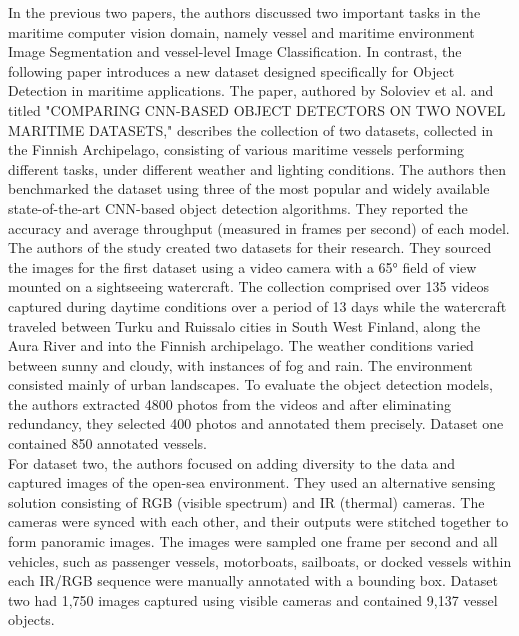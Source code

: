 In the previous two papers, the authors discussed two important tasks in the maritime computer vision domain, namely vessel and maritime environment Image Segmentation and vessel-level Image Classification. In contrast, the following paper introduces a new dataset designed specifically for Object Detection in maritime applications. The paper, authored by Soloviev et al. and titled "COMPARING CNN-BASED OBJECT DETECTORS ON TWO NOVEL MARITIME DATASETS,"\cite{soloviev2020comparing} describes the collection of two datasets, collected in the Finnish Archipelago, consisting of various maritime vessels performing different tasks, under different weather and lighting conditions. The authors then benchmarked the dataset using three of the most popular and widely available state-of-the-art CNN-based object detection algorithms. They reported the accuracy and average throughput (measured in frames per second) of each model. 
\\

The authors of the study created two datasets for their research. They sourced the images for the first dataset using a video camera with a 65° field of view mounted on a sightseeing watercraft. The collection comprised over 135 videos captured during daytime conditions over a period of 13 days while the watercraft traveled between Turku and Ruissalo cities in South West Finland, along the Aura River and into the Finnish archipelago. The weather conditions varied between sunny and cloudy, with instances of fog and rain. The environment consisted mainly of urban landscapes. To evaluate the object detection models, the authors extracted 4800 photos from the videos and after eliminating redundancy, they selected 400 photos and annotated them precisely. Dataset one contained 850 annotated vessels.
\\

For dataset two, the authors focused on adding diversity to the data and captured images of the open-sea environment. They used an alternative sensing solution consisting of RGB (visible spectrum) and IR (thermal) cameras. The cameras were synced with each other, and their outputs were stitched together to form panoramic images. The images were sampled one frame per second and all vehicles, such as passenger vessels, motorboats, sailboats, or docked vessels within each IR/RGB sequence were manually annotated with a bounding box. Dataset two had 1,750 images captured using visible cameras and contained 9,137 vessel objects.
\\

